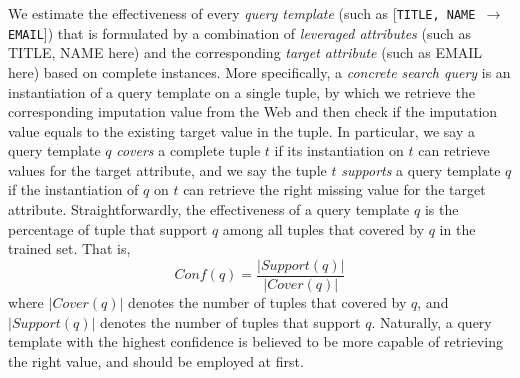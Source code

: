 \documentclass[sigconf]{acmart}
\begin{document}
We estimate the effectiveness of every {\em query template} (such as  [{\tt TITLE, NAME $\to$ EMAIL}]) that is formulated by a combination of {\em leveraged attributes} (such as TITLE, NAME here) and the corresponding {\em target attribute} (such as EMAIL here) based on complete instances.
%
More specifically, a {\em concrete search query} is an instantiation of a query template on a single tuple, by which we retrieve the  corresponding imputation value from the Web and then check if the imputation value equals to the existing target value in the tuple.
%
In particular, we say a query template $q$ {\em covers} a complete tuple $t$ if its instantiation on $t$ can retrieve values for the target attribute, and we say the tuple $t$ {\em supports} a query template $q$ if the instantiation of $q$ on $t$ can retrieve the right missing value for the target attribute. Straightforwardly, the effectiveness of a query template $q$ is the percentage of tuple that support $q$ among all tuples that covered by $q$ in the trained set. That is,
\begin{equation}
Conf(q)=\frac{|Support(q)|}{|Cover(q)|}
\end{equation}
where $|Cover(q)|$ denotes the number of tuples that covered by $q$, and $|Support(q)|$ denotes the number of tuples that support $q$. Naturally, a query template with the highest confidence is believed to be more capable of retrieving the right value, and should be employed at first.



\end{document}
